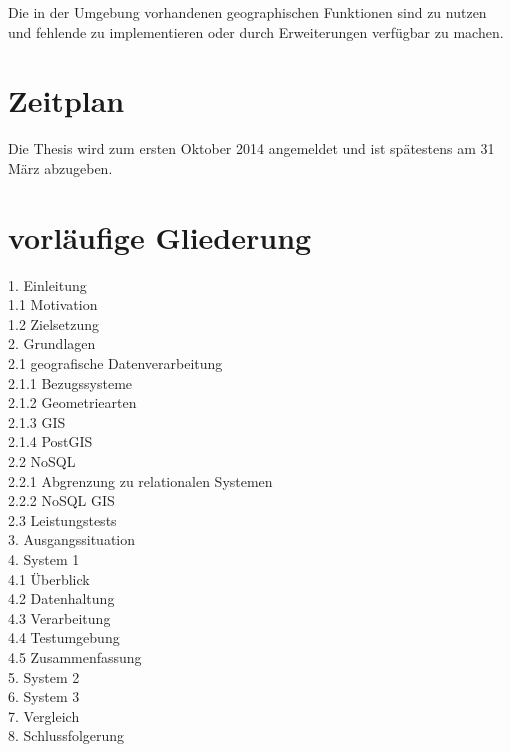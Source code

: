 \documentclass[
a4paper,     %
12pt         %
]{scrartcl}  %
\begin{document}
Die in der Umgebung vorhandenen geographischen Funktionen sind zu nutzen und fehlende zu implementieren oder durch Erweiterungen verfügbar zu machen.


\section{Zeitplan}

Die Thesis wird zum ersten Oktober 2014 angemeldet und ist spätestens am 31 März abzugeben.





\section{vorläufige Gliederung}

1. Einleitung\\
1.1 Motivation\\
1.2 Zielsetzung\\
2. Grundlagen\\
2.1 geografische Datenverarbeitung\\
2.1.1 Bezugssysteme\\
2.1.2 Geometriearten\\
2.1.3 GIS\\
2.1.4 PostGIS\\
2.2 NoSQL\\
2.2.1 Abgrenzung zu relationalen Systemen\\
2.2.2 NoSQL GIS\\
2.3 Leistungstests\\
3. Ausgangssituation\\
4. System 1\\
4.1 Überblick\\
4.2 Datenhaltung\\
4.3 Verarbeitung\\
4.4 Testumgebung\\
4.5 Zusammenfassung\\
5. System 2\cite{website:9}\\
6. System 3\cite{website:7}\\
7. Vergleich\\
8. Schlussfolgerung\\









% 

% 
\end{document}
